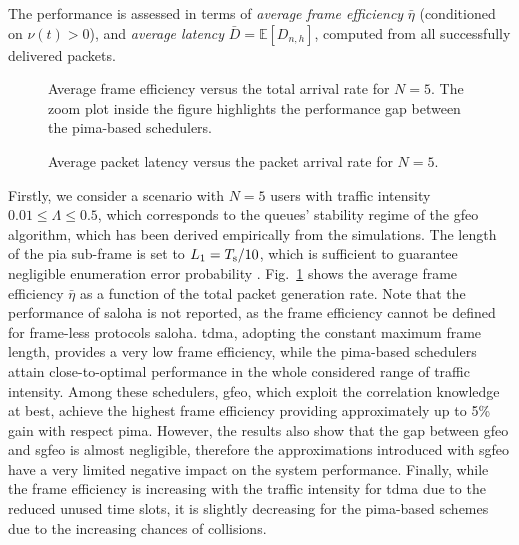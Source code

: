 \documentclass[conference]{IEEEtran}
\newlength\fheight
\newlength\fwidth
\begin{document}
The performance is assessed in terms of \textit{average frame efficiency} $\bar{\eta}$ (conditioned on $\nu(t)>0$), and \textit{average latency} $\bar{D} = \mathbb{E}[D_{n, h}]$, computed from all successfully delivered packets.

\begin{figure}
    \centering
    \setlength{}
    \setlength{}
    
    \vspace{-10pt}
     \caption{Average frame efficiency versus the total arrival rate for $N = 5$. The zoom plot inside the figure highlights the performance gap between the \ac{pima}-based schedulers.}
     \label{fig:frameeffN5}
\end{figure}

\begin{figure}
    \centering
    \setlength{}
    \setlength{}
    
    \vspace{-10pt}
     \caption{Average packet latency versus the packet arrival rate for $N = 5$.}
     \label{fig:latencyN5}
     \vspace{-10pt}
\end{figure}

Firstly, we consider a scenario with $N = 5$ users with traffic intensity $0.01\leq\Lambda\leq0.5$, which corresponds to the queues' stability regime of the \ac{gfeo} algorithm, which has been derived empirically from the simulations. The length of the \ac{pia} sub-frame is set to $L_1 = T_{\rm s}/10$, which is sufficient to guarantee negligible enumeration error probability \cite{rech2023partial}.
Fig.~\ref{fig:frameeffN5} shows the average frame efficiency $\bar{\eta}$ as a function of the total packet generation rate. 
Note that the performance of \ac{saloha} is not reported, as the frame efficiency cannot be defined for frame-less protocols \ac{saloha}.
\Ac{tdma}, adopting the constant maximum frame length, provides a very low frame efficiency, while the \ac{pima}-based schedulers attain close-to-optimal performance in the whole considered range of traffic intensity. Among these schedulers, \ac{gfeo}, which exploit the correlation knowledge at best, achieve the highest frame efficiency providing approximately up to 5\% gain with respect \ac{pima}. However, the results also show that the gap between \ac{gfeo} and \ac{sgfeo} is almost negligible, therefore the approximations introduced with \ac{sgfeo} have a very limited negative impact on the system performance.  
Finally, while the frame efficiency is increasing with the traffic intensity for \ac{tdma} due to the reduced unused time slots, it is slightly decreasing for the \ac{pima}-based schemes due to the increasing chances of collisions.
\end{document}
